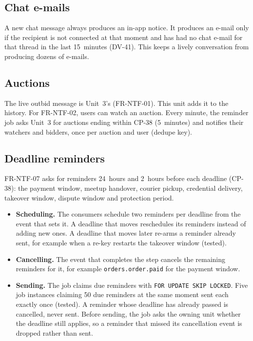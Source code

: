 \documentclass[11pt,a4paper]{article}
\begin{document}
\subsection{Chat e-mails}
A new chat message always produces an in-app notice. It produces an e-mail only if the recipient is not connected at that moment and has had no chat e-mail for that thread in the last 15~minutes (DV-41). This keeps a lively conversation from producing dozens of e-mails.

\subsection{Auctions}
The live outbid message is Unit~3's (FR-NTF-01). This unit adds it to the history. For FR-NTF-02, users can watch an auction. Every minute, the reminder job asks Unit~3 for auctions ending within CP-38 (5~minutes) and notifies their watchers and bidders, once per auction and user (dedupe key).

\subsection{Deadline reminders}
\label{sec:reminders}
FR-NTF-07 asks for reminders 24~hours and 2~hours before each deadline (CP-38): the payment window, meetup handover, courier pickup, credential delivery, takeover window, dispute window and protection period.
\begin{itemize}[nosep]
  \item \textbf{Scheduling.} The consumers schedule two reminders per deadline from the event that sets it. A deadline that moves reschedules its reminders instead of adding new ones. A deadline that moves later re-arms a reminder already sent, for example when a re-key restarts the takeover window (tested).
  \item \textbf{Cancelling.} The event that completes the step cancels the remaining reminders for it, for example \texttt{orders.order.paid} for the payment window.
  \item \textbf{Sending.} The job claims due reminders with \texttt{FOR UPDATE SKIP LOCKED}. Five job instances claiming 50 due reminders at the same moment sent each exactly once (tested). A reminder whose deadline has already passed is cancelled, never sent. Before sending, the job asks the owning unit whether the deadline still applies, so a reminder that missed its cancellation event is dropped rather than sent.
\end{itemize}
\end{document}
